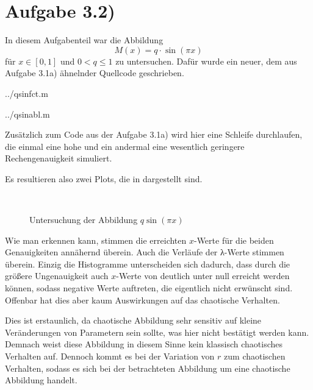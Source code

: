 \section*{Aufgabe 3.2)}
In diesem Aufgabenteil war die Abbildung $$M(x) = q\cdot \sin(πx)$$ für $x\in
[0,1]$ und $0< q \le 1$ zu untersuchen. Dafür wurde ein neuer, dem aus
Aufgabe 3.1a) ähnelnder Quellcode geschrieben.



 {../qsinfct.m}

 {../qsinabl.m}

Zusätzlich zum Code aus der Aufgabe 3.1a) wird hier eine Schleife durchlaufen,
die einmal eine hohe und ein andermal eine wesentlich geringere
Rechengenauigkeit simuliert. 

Es resultieren also zwei Plots, die in  dargestellt sind.

\begin{figure}[htb]%
\begin{center}%
  \\
\caption{Untersuchung der Abbildung $q\sin(πx)$}
\label{fig:qsin}
\end{center}
\end{figure}

Wie man erkennen kann, stimmen die erreichten $x$-Werte für die beiden
Genauigkeiten annähernd überein. Auch die Verläufe der λ-Werte stimmen überein.
Einzig die Histogramme unterscheiden sich dadurch, dass durch die größere
Ungenauigkeit auch $x$-Werte von deutlich unter null erreicht werden können,
sodass negative Werte auftreten, die eigentlich nicht erwünscht sind. Offenbar
hat dies aber kaum Auswirkungen auf das chaotische Verhalten.

Dies ist erstaunlich, da chaotische Abbildung sehr sensitiv auf kleine
Veränderungen von Parametern sein sollte, was hier nicht bestätigt werden kann.
Demnach weist diese Abbildung in diesem Sinne kein klassisch chaotisches
Verhalten auf. Dennoch kommt es bei der Variation von $r$ zum chaotischen
Verhalten, sodass es sich bei der betrachteten Abbildung um eine chaotische
Abbildung handelt.